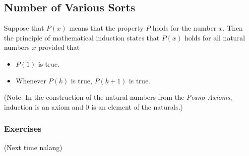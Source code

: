 \subsection{Number of Various Sorts}
\begin{defi} Suppose that $P(x)$ means that the property
$P$ holds for the number $x$. Then the principle of mathematical induction
states that $P(x)$ holds for all natural numbers $x$ provided that
\begin{itemize}
    \item $P(1)$ is true.
    \item Whenever $P(k)$ is true, $P(k+1)$ is true.
\end{itemize}     
\end{defi}

(Note: In the construction of the natural numbers from the \emph{Peano Axioms},
induction is an axiom and $0$ is an element of the naturals.)

\subsubsection{Exercises}
(Next time nalang)